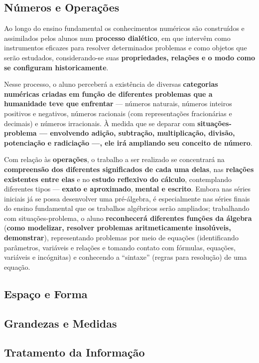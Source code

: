 \subsection{Números e Operações}

Ao longo do ensino fundamental os conhecimentos numéricos são construídos e assimilados pelos alunos num \textbf{processo dialético}, em que intervêm como instrumentos eficazes para resolver determinados problemas e como objetos que serão estudados, considerando-se suas \textbf{propriedades, relações e o modo como se configuram historicamente}.
 
Nesse processo, o aluno perceberá a existência de diversas \textbf{categorias numéricas criadas em função de diferentes problemas que a humanidade teve que enfrentar} — números naturais, números inteiros positivos e negativos, números racionais (com representações fracionárias e decimais) e números irracionais. À medida que se deparar com\textbf{ situações-problema — envolvendo adição, subtração, multiplicação, divisão, potenciação e radiciação —, ele irá ampliando seu conceito de número}.

Com relação às \textbf{operações}, o trabalho a ser realizado se concentrará na \textbf{compreensão dos diferentes significados de cada uma delas}, nas \textbf{relações existentes entre elas} e no \textbf{estudo reflexivo do cálculo}, contemplando diferentes tipos — \textbf{exato e aproximado},\textbf{ mental e escrito}. Embora nas séries iniciais já se possa desenvolver uma pré-álgebra, é especialmente nas séries finais do ensino fundamental que os trabalhos algébricos serão ampliados; trabalhando com situações-problema, o aluno \textbf{reconhecerá diferentes funções da álgebra} (\textbf{como modelizar, resolver problemas aritmeticamente insolúveis, demonstrar}), representando problemas por meio de equações (identificando parâmetros, variáveis e relações e tomando contato com fórmulas, equações, variáveis e incógnitas) e conhecendo a “sintaxe” (regras para resolução) de uma equação.


\subsection{Espaço e Forma}

\subsection{Grandezas e Medidas}

\subsection{Tratamento da Informação}

